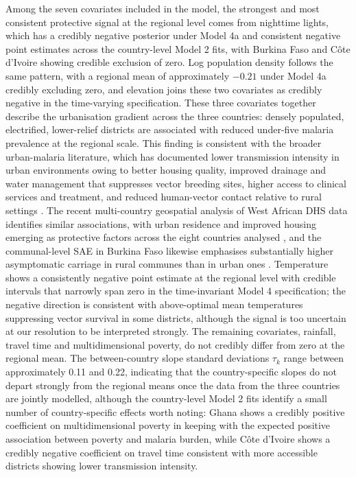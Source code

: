 \documentclass{article}
\begin{document}
Among the seven covariates included in the model, the strongest and most
consistent protective signal at the regional level comes from nighttime
lights, which has a credibly negative posterior under Model 4a and
consistent negative point estimates across the country-level Model 2
fits, with Burkina Faso and Côte d'Ivoire showing credible exclusion of
zero. Log population density follows the same pattern, with a regional
mean of approximately \(-0.21\) under Model 4a credibly excluding zero,
and elevation joins these two covariates as credibly negative in the
time-varying specification. These three covariates together describe the
urbanisation gradient across the three countries: densely populated,
electrified, lower-relief districts are associated with reduced
under-five malaria prevalence at the regional scale. This finding is
consistent with the broader urban-malaria literature, which has
documented lower transmission intensity in urban environments owing to
better housing quality, improved drainage and water management that
suppresses vector breeding sites, higher access to clinical services and
treatment, and reduced human-vector contact relative to rural settings
\citep{bhatt2015, weiss2020}. The recent multi-country geospatial
analysis of West African DHS data identifies similar associations, with
urban residence and improved housing emerging as protective factors
across the eight countries analysed \citep{aide2025}, and the
communal-level SAE in Burkina Faso likewise emphasises substantially
higher asymptomatic carriage in rural communes than in urban ones
\citep{bassinga2024}. Temperature shows a consistently negative point
estimate at the regional level with credible intervals that narrowly
span zero in the time-invariant Model 4 specification; the negative
direction is consistent with above-optimal mean temperatures suppressing
vector survival in some districts, although the signal is too uncertain
at our resolution to be interpreted strongly. The remaining covariates,
rainfall, travel time and multidimensional poverty, do not credibly
differ from zero at the regional mean. The between-country slope
standard deviations \(\tau_k\) range between approximately 0.11 and
0.22, indicating that the country-specific slopes do not depart strongly
from the regional means once the data from the three countries are
jointly modelled, although the country-level Model 2 fits identify a
small number of country-specific effects worth noting: Ghana shows a
credibly positive coefficient on multidimensional poverty in keeping
with the expected positive association between poverty and malaria
burden, while Côte d'Ivoire shows a credibly negative coefficient on
travel time consistent with more accessible districts showing lower
transmission intensity.
\end{document}
